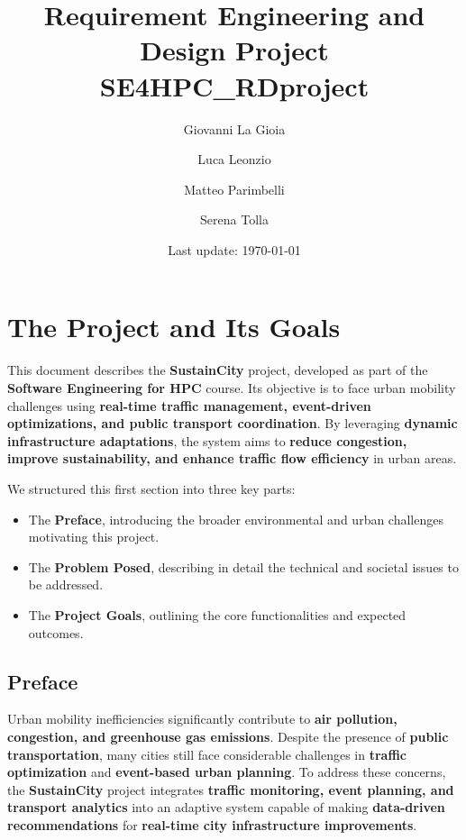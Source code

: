 \documentclass[a4paper,12pt]{article}
\title{Requirement Engineering and Design Project \\ SE4HPC_RDproject}
\author[1]{Giovanni La Gioia}
\author[2]{Luca Leonzio}
\author[3]{Matteo Parimbelli}
\author[4]{Serena Tolla}
\affil[1,2,3,4]{Politecnico di Milano}
\date{Last update: \today}
\begin{document}
\maketitle
\newpage
\tableofcontents
\clearpage
\newpage

\section{The Project and Its Goals}
This document describes the \textbf{SustainCity} project, developed as part of the \textbf{Software Engineering for HPC} course. 
Its objective is to face urban mobility challenges using \textbf{real-time traffic management, event-driven optimizations, and public transport coordination}. 
By leveraging \textbf{dynamic infrastructure adaptations}, the system aims to \textbf{reduce congestion, improve sustainability, and enhance traffic flow efficiency} in urban areas.

We structured this first section into three key parts:
\begin{itemize}
    \item The \textbf{Preface}, introducing the broader environmental and urban challenges motivating this project.
    \item The \textbf{Problem Posed}, describing in detail the technical and societal issues to be addressed.
    \item The \textbf{Project Goals}, outlining the core functionalities and expected outcomes.
\end{itemize}

\subsection{Preface}
Urban mobility inefficiencies significantly contribute to \textbf{air pollution, congestion, and greenhouse gas emissions}. Despite the presence of \textbf{public transportation}, many cities still face considerable challenges in \textbf{traffic optimization} and \textbf{event-based urban planning}.
To address these concerns, the \textbf{SustainCity} project integrates \textbf{traffic monitoring, event planning, and transport analytics} into an adaptive system capable of making \textbf{data-driven recommendations} for \textbf{real-time city infrastructure improvements}.
\end{document}
